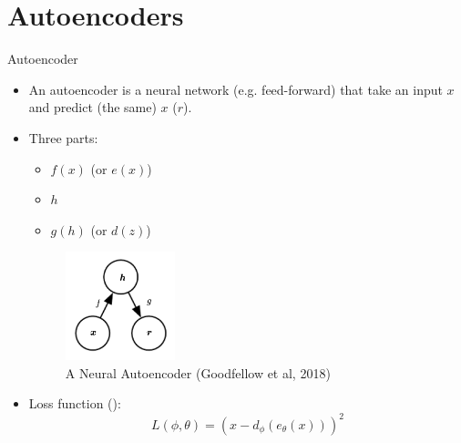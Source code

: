 \documentclass[10pt]{beamer}
\begin{document}

\section{Autoencoders}
\frame{\sectionpage}

\begin{frame}{Autoencoder}

\begin{itemize}
\item An autoencoder is a neural network (e.g. feed-forward) that take an input $x$ and predict (the same) $x$ ($r$). \pause
\item Three parts:
\begin{itemize}
\item {} $f(x)$ (or $e(x)$)
\item {} $h$
\item {} $g(h)$ (or $d(z)$)
\end{itemize}

\begin{figure}[h]
\centering
\includegraphics[width=0.3\textwidth]{fig/DL_14_1_ae}
\caption{A Neural Autoencoder (Goodfellow et al, 2018)}
\end{figure}

\pause

\item Loss function ():
\[
L(\phi, \theta) = (x - d_\phi(e_\theta(x)))^2
\]
\end{itemize}

\end{frame}
\end{document}

